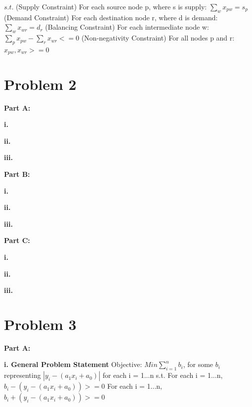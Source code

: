 \documentclass[paper=a4, fontsize=11pt]{scrartcl} %
\numberwithin{equation}{section} %
\numberwithin{figure}{section} %
\numberwithin{table}{section} %
\begin{document}
$s.t.$\newline
(Supply Constraint) For each source node p, where s is supply: $\sum_{w}{x_{pw}} = s_{p}$\newline
(Demand Constraint) For each destination node r, where d is demand: $\sum_{w}{x_{wr}} = d_{r}$\newline
(Balancing Constraint) For each intermediate node w: $\sum_{p}{x_{pw}} - \sum_{r}{x_{wr}} <= 0$\newline
(Non-negativity Constraint) For all nodes p and r: $x_{pw}, x_{wr} >= 0$\newline


\section{Problem 2}
\textbf{Part A:}
	
	\textbf{i.}
    
    \textbf{ii.}
    
    \textbf{iii.}
    
\textbf{Part B:}
    
    \textbf{i.}
    
    \textbf{ii.}
    
    \textbf{iii.}
    
\textbf{Part C:}
	
    \textbf{i.}
    
    \textbf{ii.}
    
    \textbf{iii.}
    
\section{Problem 3}
\textbf{Part A:}

    \textbf{i. General Problem Statement}\newline
	Objective:\newline    
    $Min \sum_{i=1}^{n}{b_i}$, for some $b_i$ representing $|y_i - (a_1x_i + a_0)|$ for each i = 1...n\newline
    s.t.\newline
    For each i = 1...n, $b_i - (y_i - (a_1x_i + a_0)) >= 0$\newline
    For each i = 1...n, $b_i + (y_i - (a_1x_i + a_0)) >= 0$\newline
    
\end{document}
